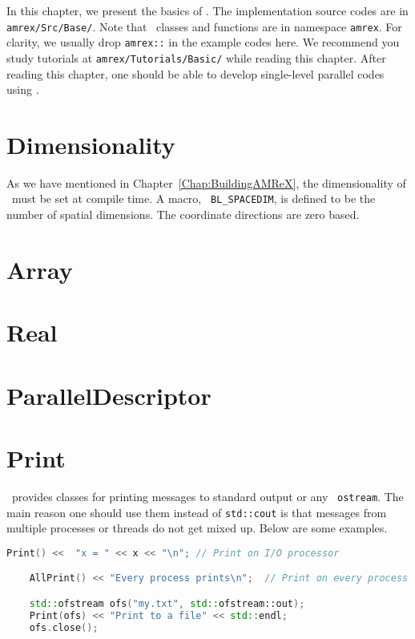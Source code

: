 In this chapter, we present the basics of \amrex.  The implementation
source codes are in {\tt amrex/Src/Base/}.  Note that \amrex\ classes
and functions are in namespace {\tt amrex}.  For clarity, we usually
drop {\tt amrex::} in the example codes here.  We recommend you study
tutorials at {\tt amrex/Tutorials/Basic/} while reading this chapter.
After reading this chapter, one should be able to develop single-level
parallel codes using \amrex.

\section{Dimensionality}
\label{sec:basics:dim}

As we have mentioned in Chapter~\ref{Chap:BuildingAMReX}, the
dimensionality of \amrex\ must be set at compile time.  A macro, {\tt
  BL\_SPACEDIM}, is defined to be the number of spatial dimensions.
The coordinate directions are zero based. 

\section{Array}

\section{Real}

\section{ParallelDescriptor}

\section{Print}
\label{sec:basics:print}

\amrex\ provides classes for printing messages to standard output or
any \cpp\ {\tt ostream}.  The main reason one should use them instead
of {\tt std::cout} is that messages from multiple processes or
threads do not get mixed up.  Below are some examples.
\begin{lstlisting}[language=cpp]
    Print() <<  "x = " << x << "\n"; // Print on I/O processor

    AllPrint() << "Every process prints\n";  // Print on every process

    std::ofstream ofs("my.txt", std::ofstream::out);
    Print(ofs) << "Print to a file" << std::endl;
    ofs.close();
\end{lstlisting}

